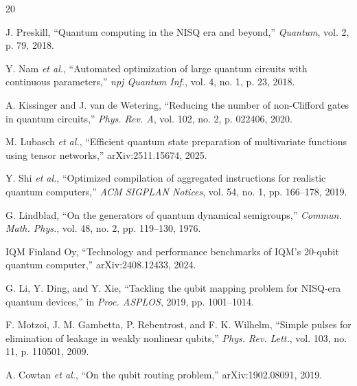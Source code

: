 \documentclass[journal]{IEEEtran}
\begin{document}
\begin{thebibliography}{20}

J. Preskill, ``Quantum computing in the NISQ era and beyond,'' \textit{Quantum}, vol. 2, p. 79, 2018.

Y. Nam \textit{et al.}, ``Automated optimization of large quantum circuits with continuous parameters,'' \textit{npj Quantum Inf.}, vol. 4, no. 1, p. 23, 2018.

A. Kissinger and J. van de Wetering, ``Reducing the number of non-Clifford gates in quantum circuits,'' \textit{Phys. Rev. A}, vol. 102, no. 2, p. 022406, 2020.

M. Lubasch \textit{et al.}, ``Efficient quantum state preparation of multivariate functions using tensor networks,'' arXiv:2511.15674, 2025.

Y. Shi \textit{et al.}, ``Optimized compilation of aggregated instructions for realistic quantum computers,'' \textit{ACM SIGPLAN Notices}, vol. 54, no. 1, pp. 166--178, 2019.

G. Lindblad, ``On the generators of quantum dynamical semigroups,'' \textit{Commun. Math. Phys.}, vol. 48, no. 2, pp. 119--130, 1976.

IQM Finland Oy, ``Technology and performance benchmarks of IQM's 20-qubit quantum computer,'' arXiv:2408.12433, 2024.

G. Li, Y. Ding, and Y. Xie, ``Tackling the qubit mapping problem for NISQ-era quantum devices,'' in \textit{Proc. ASPLOS}, 2019, pp. 1001--1014.

F. Motzoi, J. M. Gambetta, P. Rebentrost, and F. K. Wilhelm, ``Simple pulses for elimination of leakage in weakly nonlinear qubits,'' \textit{Phys. Rev. Lett.}, vol. 103, no. 11, p. 110501, 2009.

A. Cowtan \textit{et al.}, ``On the qubit routing problem,'' arXiv:1902.08091, 2019.

\end{thebibliography}
\end{document}

